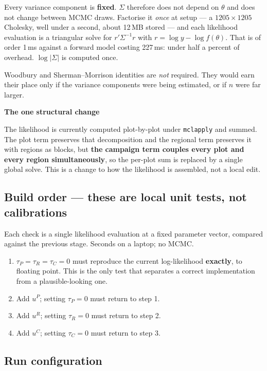 \documentclass[11pt]{article}
\newenvironment{warnbox}[1][]{%
  \begin{leftbar}\noindent\textcolor{red!60!black}{\textbf{\small #1}}\par\vspace{0.3em}\small}{\end{leftbar}}
\begin{document}
Every variance component is \textbf{fixed}. $\Sigma$ therefore does not depend on
$\theta$ and does not change between MCMC draws. Factorise it \emph{once} at setup
--- a $1205\times1205$ Cholesky, well under a second, about 12\,MB stored --- and
each likelihood evaluation is a triangular solve for $r'\Sigma^{-1}r$ with
$r = \log y - \log f(\theta)$. That is of order 1\,ms against a forward model
costing 227\,ms: under half a percent of overhead. $\log|\Sigma|$ is computed once.

Woodbury and Sherman--Morrison identities are \emph{not} required. They would earn
their place only if the variance components were being estimated, or if $n$ were far
larger.

\begin{warnbox}[The one structural change]
The likelihood is currently computed plot-by-plot under \texttt{mclapply} and
summed. The plot term preserves that decomposition and the regional term preserves
it with regions as blocks, but \textbf{the campaign term couples every plot and
every region simultaneously}, so the per-plot sum is replaced by a single global
solve. This is a change to how the likelihood is assembled, not a local edit.
\end{warnbox}

\subsection{Build order --- these are local unit tests, not calibrations}

Each check is a single likelihood evaluation at a fixed parameter vector, compared
against the previous stage. Seconds on a laptop; no MCMC.

\begin{enumerate}[nosep]
\item $\tau_P = \tau_R = \tau_C = 0$ must reproduce the current log-likelihood
      \textbf{exactly}, to floating point. This is the only test that separates a
      correct implementation from a plausible-looking one.
\item Add $u^{P}$; setting $\tau_P=0$ must return to step 1.
\item Add $u^{R}$; setting $\tau_R=0$ must return to step 2.
\item Add $u^{C}$; setting $\tau_C=0$ must return to step 3.
\end{enumerate}

\subsection{Run configuration}
\end{document}
